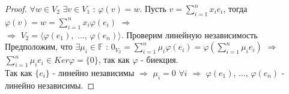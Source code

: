 \documentclass[a4paper, 12pt]{article}
\newcommand{\F}{\mathbb F}
\renewcommand{\phi}{\varphi}
\theoremstyle{definition}
\theoremstyle{plain}
\theoremstyle{remark}
\begin{document}
\begin{proof}
    $\forall w\in V_2$ $\exists v\in V_1$ : $\phi(v)=w$. Пусть $v=\sum\limits_{i=1}^nx_ie_i$, тогда $\phi(v)=w=\sum\limits_{i=1}^nx_i\phi(e_i)$ $\Longrightarrow$\\ $\Longrightarrow$ $V_2=\langle\phi(e_1),$ $\ldots$, $\phi(e_n)\rangle$. Проверим линейную независимость\\
    Предположим, что $\exists\mu_i\in\F$ : $0_{V_2}=\sum\limits_{i=1}^n\mu_i\phi(e_i)=\phi(\sum\limits_{i=1}^n\mu_ie_i)$ $\Longrightarrow$ $\sum\limits_{i=1}^n\mu_ie_i\in Ker\phi=\{0\}$, так как $\phi$ - биекция.\\ Так как $\{e_i\}$ - линейно независимы $\Longrightarrow$ $\mu_i=0$ $\forall i$ $\Longrightarrow$ $\phi(e_1)$, $\ldots$, $\phi(e_n)$ - линейно независимы.
  \end{proof}
\end{document}

